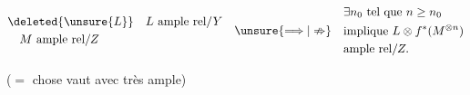 \[
\begin{aligned}
 &\deleted{\unsure{L}}\quad L\ \text{ample rel}/Y\\
 &\quad M\ \text{ample rel}/Z
\end{aligned}
\quad\unsure{\Longrightarrow|\nRightarrow}\quad
\begin{aligned}
 &\exists n_0\ \text{tel que }n\geq n_0\\
 &\text{implique } L\otimes f^*(M^{\otimes n})\\
 &\text{ample rel}/Z.
\end{aligned}
\]

($=$ chose vaut avec très ample)

